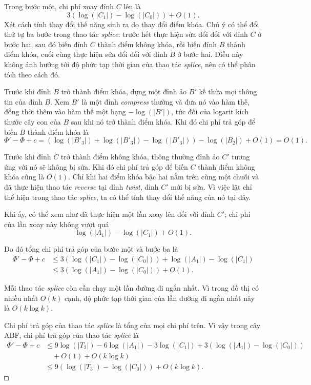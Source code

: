 \documentclass[11pt]{article}
\newcommand{\square}{\mathord{\vcenter{\hrule height .5pt
  \hbox{\vrule width .5pt height 5pt\kern5pt\vrule width .5pt}
  \hrule height .5pt}}}
\begin{document}
Trong bước một, chi phí xoay đỉnh \(C\) lên là
\[
  3(\log(|C_1|)-\log(|C_0|))+O(1).
\]
Xét cách tính thay đổi thế năng sinh ra do thay đổi điểm khóa. Chú ý có thể
đổi thứ tự ba bước trong thao tác \emph{splice}: trước hết thực hiện sửa đổi
đối với đỉnh \(C\) ở bước hai, sau đó biến đỉnh \(C\) thành điểm không khóa,
rồi biến đỉnh \(B\) thành điểm khóa, cuối cùng thực hiện sửa đổi đối với
đỉnh \(B\) ở bước hai. Điều này không ảnh hưởng tới độ phức tạp thời gian của
thao tác \emph{splice}, nên có thể phân tích theo cách đó.

Trước khi đỉnh \(B\) trở thành điểm khóa, dựng một đỉnh ảo \(B'\) kế thừa mọi
thông tin của đỉnh \(B\). Xem \(B'\) là một đỉnh \emph{compress} thường và
đưa nó vào hàm thế, đồng thời thêm vào hàm thế một hạng \(-\log(|B'|)\), tức
đối của logarit kích thước cây con của \(B\) sau khi nó trở thành điểm khóa.
Khi đó chi phí trả góp để biến \(B\) thành điểm khóa là
\[
  \Phi'-\Phi+c
  =(\log(|B'_3|)+\log(|B'_3|)-\log(|B'_3|))
    -\log(|B_2|)+O(1)=O(1).
\]

Trước khi đỉnh \(C\) trở thành điểm không khóa, thông thường đỉnh ảo \(C'\)
tương ứng với nó sẽ không bị sửa. Khi đó chi phí trả góp để biến \(C\) thành
điểm không khóa cũng là \(O(1)\). Chỉ khi hai điểm khóa bậc hai nằm trên cùng
một chuỗi và đã thực hiện thao tác \emph{reverse} tại đỉnh \emph{twist},
đỉnh \(C'\) mới bị sửa. Vì việc lật chỉ thể hiện trong thao tác
\emph{splice}, ta có thể tính thay đổi thế năng của nó tại đây.

Khi ấy, có thể xem như đã thực hiện một lần xoay lên đối với đỉnh \(C'\);
chi phí của lần xoay này không vượt quá
\[
  \log(|A_1|)-\log(|C_1|)+O(1).
\]

Do đó tổng chi phí trả góp của bước một và bước ba là
\[
\begin{aligned}
  \Phi'-\Phi+c
  &\le 3(\log(|C_1|)-\log(|C_0|))+\log(|A_1|)-\log(|C_1|)\\
  &\le 3(\log(|A_1|)-\log(|C_0|))+O(1).
\end{aligned}
\]

Mỗi thao tác \emph{splice} còn cần chạy một lần đường đi ngắn nhất. Vì trong
đồ thị có nhiều nhất \(O(k)\) cạnh, độ phức tạp thời gian của lần đường đi
ngắn nhất này là \(O(k\log k)\).

Chi phí trả góp của thao tác \emph{splice} là tổng của mọi chi phí trên. Vì
vậy trong cây ABF, chi phí trả góp của thao tác \emph{splice} là
\[
\begin{aligned}
\Phi'-\Phi+c
&\le 9\log(|T_2|)-6\log(|A_1|)-3\log(|C_1|)
  +3(\log(|A_1|)-\log(|C_0|))\\
&\quad+O(1)+O(k\log k)\\
&\le 9(\log(|T_3|)-\log(|C_0|))+O(k\log k).
\end{aligned}
\]
\(\square\)
\end{document}
